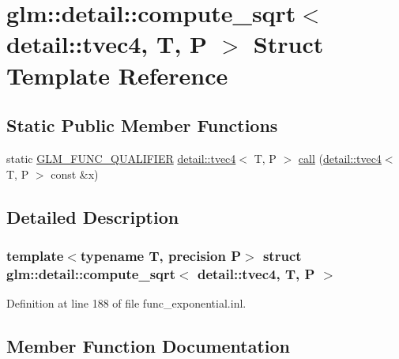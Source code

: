 \hypertarget{structglm_1_1detail_1_1compute__sqrt_3_01detail_1_1tvec4_00_01_t_00_01_p_01_4}{}\section{glm\+:\+:detail\+:\+:compute\+\_\+sqrt$<$ detail\+:\+:tvec4, T, P $>$ Struct Template Reference}
\label{structglm_1_1detail_1_1compute__sqrt_3_01detail_1_1tvec4_00_01_t_00_01_p_01_4}
\subsection*{Static Public Member Functions}
\begin{DoxyCompactItemize}
\item 
static \hyperlink{setup_8hpp_a33fdea6f91c5f834105f7415e2a64407}{G\+L\+M\+\_\+\+F\+U\+N\+C\+\_\+\+Q\+U\+A\+L\+I\+F\+I\+ER} \hyperlink{structglm_1_1detail_1_1tvec4}{detail\+::tvec4}$<$ T, P $>$ \hyperlink{structglm_1_1detail_1_1compute__sqrt_3_01detail_1_1tvec4_00_01_t_00_01_p_01_4_a75a6bf4911534e88541e66391ffb3f6e}{call} (\hyperlink{structglm_1_1detail_1_1tvec4}{detail\+::tvec4}$<$ T, P $>$ const \&x)
\end{DoxyCompactItemize}


\subsection{Detailed Description}
\subsubsection*{template$<$typename T, precision P$>$\newline
struct glm\+::detail\+::compute\+\_\+sqrt$<$ detail\+::tvec4, T, P $>$}



Definition at line 188 of file func\+\_\+exponential.\+inl.



\subsection{Member Function Documentation}
\mbox{\label{structglm_1_1detail_1_1compute__sqrt_3_01detail_1_1tvec4_00_01_t_00_01_p_01_4_a75a6bf4911534e88541e66391ffb3f6e}} 
